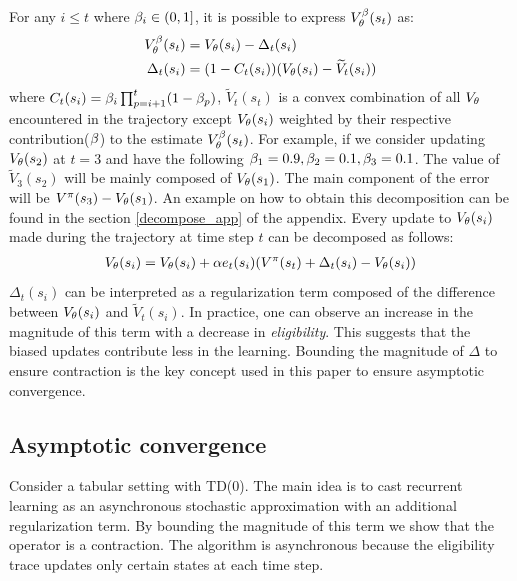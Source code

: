 For any $i \leq t$ where $\beta_i \in (0,1]$, it is possible to express $V^{\beta}_{\theta}(s_t)$ as:
\begin{equation}
\begin{split}\label{decompose}
    V^{\beta}_{\theta}(s_t) &= V_{\theta}(s_i) - \Delta_t(s_i) \\
    \Delta_t(s_i) &= (1-C_t(s_i))(V_{\theta}(s_i) - \widetilde{V}_t(s_i) ) 
\end{split}
\end{equation}
where $C_t(s_i) = \beta_i \prod_{p=i+1}^t (1-\beta_p)$, $\widetilde{V}_t(s_t)$ is a convex combination of all $V_{\theta}$ encountered in the trajectory except $V_{\theta}(s_i)$ weighted by their respective contribution($\beta$) to the estimate $V^{\beta}_{\theta}(s_t)$. For example, if we consider updating $V_{\theta}(s_2)$ at $t=3$ and have the following $\beta_1 = 0.9,\beta_2 = 0.1,\beta_3 = 0.1$. The value of $\widetilde{V}_3(s_2)$ will be mainly composed of $V_{\theta}(s_1)$. The main component of the error will be $V^{\pi}(s_3) - V_{\theta}(s_1)$. An example on how to obtain this decomposition can be found in the section \ref{decompose_app} of the appendix. 
Every update to $V_{\theta}(s_i)$ made during the trajectory at time step $t$ can be decomposed as follows:
\begin{equation}
\label{decompose}
\begin{split}
    V_{\theta}(s_i) = V_{\theta}(s_i) + \alpha e_t(s_i) ( V^{\pi}(s_t) + \Delta_t(s_i) - V_{\theta}(s_i))
\end{split}
\end{equation}
$\Delta_t(s_i)$ can be interpreted as a regularization term composed of the difference between $V_{\theta}(s_i)$ and $\widetilde{V}_t(s_i)$. In practice, one can observe an increase in the magnitude of this term with a decrease in \emph{eligibility}. This suggests that the biased updates contribute less in the learning. Bounding the magnitude of $\Delta$ to ensure contraction is the key concept used in this paper to ensure asymptotic convergence.

\subsection{Asymptotic convergence}
Consider a tabular setting with TD(0). The main idea is to cast recurrent learning as an asynchronous stochastic approximation \cite{tsitsiklis1994asynchronous} with an additional regularization term. By bounding the magnitude of this term we show that the operator is a contraction. The algorithm is asynchronous because the eligibility trace updates only certain states at each time step.

